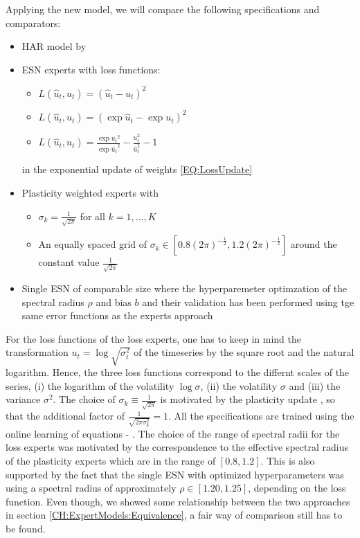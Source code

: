 Applying the new model, we will compare the following specifications and comparators:
\begin{itemize}
    \item HAR model by \cite{Corsi2009}
    \item ESN experts with loss functions:
    \begin{itemize}
        \item $L(\hat u_t, u_t) = (\hat u_t-u_t)^2$
        \item $L(\hat u_t, u_t) = (\exp{\hat u_t} - \exp{u_t})^2$
        \item $L(\hat u_t, u_t) = \frac{\exp{u_t}^2}{\exp{\hat u_t}^2} - \frac{u_t^2}{\hat u_t^2} - 1$
    \end{itemize} 
    in the exponential update of weights \ref{EQ:LossUpdate}
    \item Plasticity weighted experts with
    \begin{itemize}
        \item $\sigma_k = \frac{1}{\sqrt{2\pi}}$ for all $k = 1, ..., K$
        \item An equally spaced grid of $\sigma_k \in \left[0.8\left(2\pi\right)^{-\frac{1}{2}}, 1.2\left(2\pi\right)^{-\frac{1}{2}}\right]$ around the constant value $\frac{1}{\sqrt{2\pi}}$
    \end{itemize}
    \item Single ESN of comparable size where the hyperparemeter optimzation of the spectral radius $\rho$ and bias $b$ and their validation has been performed using tge same error functions as the experts approach
\end{itemize}
For the loss functions of the loss experts, one has to keep in mind the transformation $u_t = \log{\sqrt{\sigma_t^2}}$ of the timeseries by the square root and the natural logarithm. Hence, the three loss functions correspond to the differnt scales of the series, (i) the logarithm of the volatility $\log{\sigma}$, (ii) the volatility $\sigma$ and (iii) the variance $\sigma^2$.
The choice of $\sigma_k \equiv \frac{1}{\sqrt{2\pi}}$ is motivated by the plasticity update , so that the additional factor of $\frac{1}{\sqrt{2\pi\sigma_k^2}} = 1$. All the specifications are trained using the online learning of equations  - . The choice of the range of spectral radii for the loss experts was motivated by the correspondence to the effective spectral radius of the plasticity experts which are in the range of $[0.8, 1.2]$. This is also supported by the fact that the single ESN with optimized hyperparameters was using a spectral radius of approximately $\rho \in [1.20, 1.25]$, depending on the loss function. Even though, we showed some relationship between the two approaches in section \ref{CH:ExpertModels:Equivalence}, a fair way of comparison still has to be found.


